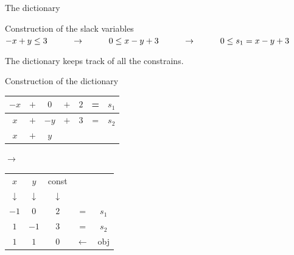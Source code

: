 \begin{frame}{The dictionary}
\begin{block}{Construction of the slack variables}
$-x+y\leq 3 \hspace*{1cm} \rightarrow \hspace*{1cm} 0 \leq x - y + 3 \hspace*{1cm} \rightarrow \hspace*{1cm} 0\leq s_1 = x - y + 3$
\end{block}
The dictionary keeps track of all the constrains.
\begin{block}{Construction of the dictionary}
\begin{tabular}{| c  c  c  c  c | c c |}
	\hline	
   	$-x$ &$+$& $0$ & $+$ & $2$ & = & $s_1$\\ \hline	
   	$x$ &$+$& $-y$ & $+$ & $3$ & = & $s_2$\\ \hline \hline	
   	$x$ & $+$ & $y$ & & & &  \\
   	\hline	
\end{tabular}
$\rightarrow$
\begin{tabular}{| c | c || c || c c |}
	\hline	
	$x$ & $y$ & const & & \\
	$\downarrow$ &$\downarrow$ &$\downarrow$ & & \\
	\hline
	\hline	
   	$-1$ & $0$ & $2$ & = & $s_1$\\ \hline	
   	$1$ & $-1$ & $3$ & = & $s_2$\\ \hline \hline	
   	$1$ & $1$ & $0$ & $\leftarrow$ & obj \\
   	\hline	
\end{tabular}

\end{block}

\end{frame}

